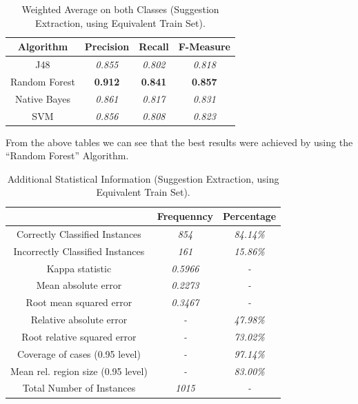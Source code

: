 \begin{table}[H]
\centering
\caption{Weighted Average on both Classes (Suggestion Extraction, using Equivalent Train Set).}
\label{411_table_rer}
\begin{tabular}{cccc}
\hline
{\bf Algorithm} & {\bf Precision} & {\bf Recall} & {\bf F-Measure} \\ \hline
J48             & {\it 0.855}     & {\it 0.802}  & {\it 0.818}     \\
Random Forest   & {\bf 0.912}     & {\bf 0.841}  & {\bf 0.857}     \\
Native Bayes    & {\it 0.861}     & {\it 0.817}  & {\it 0.831}     \\
SVM             & {\it 0.856}     & {\it 0.808}  & {\it 0.823}     \\ \hline
\end{tabular}
\end{table}

From the above tables we can see that the best results were achieved by using the ``Random Forest'' Algorithm.

\begin{table}[H]
\centering
\caption{Additional Statistical Information (Suggestion Extraction, using Equivalent Train Set).}
\label{412_table_rer}
\begin{tabular}{ccc}
\hline
                                   & {\bf Frequenncy} & {\bf Percentage} \\ \hline
Correctly Classified Instances     & {\it 854}        & {\it 84.14\%}    \\
Incorrectly Classified Instances   & {\it 161}        & {\it 15.86\%}    \\
Kappa statistic                    & {\it 0.5966}     & {\it -}          \\
Mean absolute error                & {\it 0.2273}     & {\it -}          \\
Root mean squared error            & {\it 0.3467}     & {\it -}          \\
Relative absolute error            & {\it -}          & {\it 47.98\%}    \\
Root relative squared error        & {\it -}          & {\it 73.02\%}    \\
Coverage of cases (0.95 level)     & {\it -}          & {\it 97.14\%}    \\
Mean rel. region size (0.95 level) & {\it -}          & {\it 83.00\%}    \\
Total Number of Instances          & {\it 1015}       & {\it -}          \\ \hline
\end{tabular}
\end{table}


